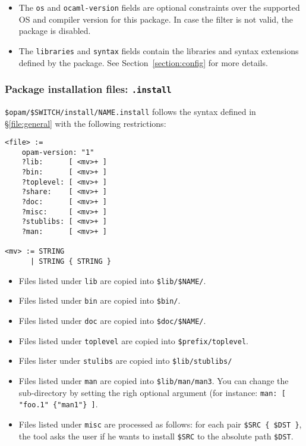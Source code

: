 \documentclass[a4paper,11pt]{article}
\begin{document}
\begin{itemize}
\item The {\tt os} and {\tt ocaml-version} fields are optional
  constraints over the supported OS and compiler version for this
  package. In case the filter is not valid, the package is disabled.

\item The {\tt libraries} and {\tt syntax} fields contain the
  libraries and syntax extensions defined by the package. See
  Section~\ref{section:config} for more details.

\end{itemize}

\subsubsection{Package installation files: {\tt *.install}}
\label{file:install}

\verb+$opam/$SWITCH/install/NAME.install+ follows the syntax defined
in \S\ref{file:general} with the following restrictions:

{\small
\begin{Verbatim}[frame=single]
<file> :=
    opam-version: "1"
    ?lib:      [ <mv>+ ]
    ?bin:      [ <mv>+ ]
    ?toplevel: [ <mv>+ ]
    ?share:    [ <mv>+ ]
    ?doc:      [ <mv>+ ]
    ?misc:     [ <mv>+ ]
    ?stublibs: [ <mv>+ ]
    ?man:      [ <mv>+ ]

<mv> := STRING
      | STRING { STRING }
\end{Verbatim}
}

\begin{itemize}
\item Files listed under {\tt lib} are copied into \verb+$lib/$NAME/+.
\item Files listed under {\tt bin} are copied into \verb+$bin/+.
\item Files listed under {\tt doc} are copied into \verb+$doc/$NAME/+.
\item Files listed under {\tt toplevel} are copied into \verb+$prefix/toplevel+.
\item Files lister under {\tt stulibs} are copied into \verb+$lib/stublibs/+
\item Files listed under {\tt man} are copied into
  \verb+$lib/man/man3+. You can change the sub-directory by setting
  the righ optional argument (for instance:
  \verb+man: [ "foo.1" {"man1"} ]+.
\item Files listed under {\tt misc} are processed as follows:
  for each pair \verb+$SRC { $DST }+, the tool asks the user if
  he wants to install \verb+$SRC+ to the absolute path \verb+$DST+.
\end{itemize}
\end{document}
